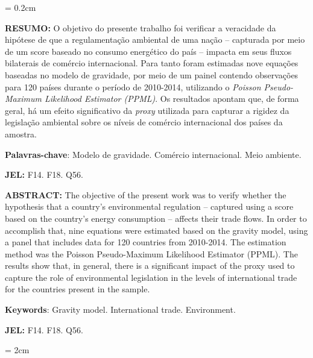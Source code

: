 


\topmargin = 0.2cm
\maketitle

\setlength{\parindent}{0cm}

\textbf{RESUMO:} O objetivo do presente trabalho foi verificar a veracidade da hipótese de que a regulamentação ambiental de uma nação – capturada por meio de um score baseado no consumo energético do país – impacta em seus fluxos bilaterais de comércio internacional. Para tanto foram estimadas nove equações baseadas no modelo de gravidade, por meio de um painel contendo observações para 120 países durante o período de 2010-2014, utilizando o \textit{Poisson Pseudo-Maximum Likelihood Estimator (PPML)}. Os resultados apontam que, de forma geral, há um efeito significativo da \textit{proxy} utilizada para capturar a rigidez da legislação ambiental sobre os níveis de comércio internacional dos países da amostra.


\textbf{Palavras-chave}:  Modelo de gravidade. Comércio internacional. Meio ambiente.

\textbf{JEL:} F14. F18. Q56. 

\vspace{0.6cm}

\textbf{ABSTRACT:} The objective of the present work was to verify whether the hypothesis that a country’s environmental regulation – captured using a score based on the country’s energy consumption – affects their trade flows. In order to accomplish that, nine equations were estimated based on the gravity model, using a panel that includes data for 120 countries from 2010-2014. The estimation method was the Poisson Pseudo-Maximum Likelihood Estimator (PPML). The results show that, in general, there is a significant impact of the proxy used to capture the role of environmental legislation in the levels of international trade for the countries present in the sample.

\textbf{Keywords}: Gravity model. International trade. Environment.

\textbf{JEL:} F14. F18. Q56. 


\topmargin = 2cm
\setlength{\parindent}{1.5cm}

\maketitle

